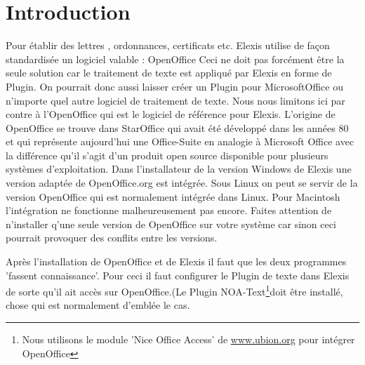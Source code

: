 
\section{Introduction}
Pour établir des lettres , ordonnances, certificats etc. Elexis utilise de façon standardisée un logiciel valable : OpenOffice
Ceci ne doit pas forcément être la seule solution car le traitement de texte est appliqué par Elexis en forme de Plugin. On pourrait donc aussi laisser créer un Plugin pour Microsoft\texttrademark{}Office\texttrademark{}  ou n'importe quel autre logiciel de traitement de texte. Nous nous limitons ici par contre à l'OpenOffice qui est le logiciel de référence pour Elexis.
L'origine de OpenOffice se trouve dans StarOffice qui avait été développé dans les années 80 et qui représente aujourd'hui une Office-Suite en analogie à Microsoft Office avec la différence qu'il s'agit d'un produit open source disponible pour plusieurs systèmes d'exploitation.
Dans l'installateur de la version Windows de Elexis une version adaptée de OpenOffice.org est intégrée. Sous Linux on peut se servir de la version OpenOffice qui est normalement intégrée dans Linux. Pour Macintosh l'intégration ne fonctionne malheureusement pas encore. Faites attention de n'installer q'une seule version de OpenOffice sur votre système car sinon ceci pourrait provoquer des conflits entre les versions.


\medskip

Après l'installation de OpenOffice et de Elexis il faut que les deux programmes 'fassent connaissance'. Pour ceci il faut configurer le Plugin de texte dans Elexis de sorte qu'il ait accès sur OpenOffice.(Le Plugin
\glqq NOA-Text\footnote{Nous utilisons le module 'Nice Office Access' de \href{http://www.ubion.org}{www.ubion.org}
 pour intégrer OpenOffice}\grqq{}doit être installé, chose qui est normalement d'emblée le cas.

